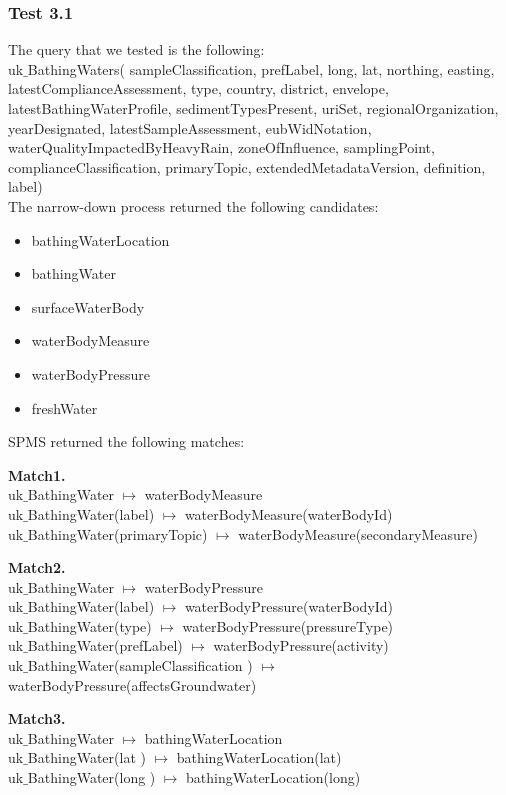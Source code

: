 \documentclass[a4paper,10pt]{article}
\begin{document}
\subsubsection{Test 3.1}
The query that we tested is the following:\\
\indent uk$\_$BathingWaters( sampleClassification, prefLabel, long, lat, northing, easting, latestComplianceAssessment, type, country, district, envelope, latestBathingWaterProfile, sedimentTypesPresent, uriSet, regionalOrganization, yearDesignated, latestSampleAssessment, eubWidNotation, waterQualityImpactedByHeavyRain, zoneOfInfluence, samplingPoint, complianceClassification, primaryTopic, extendedMetadataVersion, definition, label)\\

The narrow-down process returned the following candidates:
\begin{itemize}
\item bathingWaterLocation
\item bathingWater
\item  surfaceWaterBody
\item waterBodyMeasure
\item waterBodyPressure
\item freshWater
\end{itemize}

SPMS returned the following matches:

\textbf{Match1. }\\
uk$\_$BathingWater $\mapsto$ waterBodyMeasure\\
uk$\_$BathingWater(label) $\mapsto$ waterBodyMeasure(waterBodyId)\\
uk$\_$BathingWater(primaryTopic) $\mapsto$ waterBodyMeasure(secondaryMeasure)

\textbf{Match2. }\\
uk$\_$BathingWater $\mapsto$ waterBodyPressure\\
uk$\_$BathingWater(label) $\mapsto$ waterBodyPressure(waterBodyId)\\
uk$\_$BathingWater(type) $\mapsto$ waterBodyPressure(pressureType)\\
uk$\_$BathingWater(prefLabel) $\mapsto$ waterBodyPressure(activity)\\
uk$\_$BathingWater(sampleClassification ) $\mapsto$ waterBodyPressure(affectsGroundwater)

\textbf{Match3. }\\
uk$\_$BathingWater  $\mapsto$ bathingWaterLocation\\
uk$\_$BathingWater(lat ) $\mapsto$ bathingWaterLocation(lat)\\
uk$\_$BathingWater(long ) $\mapsto$ bathingWaterLocation(long)
\end{document}
